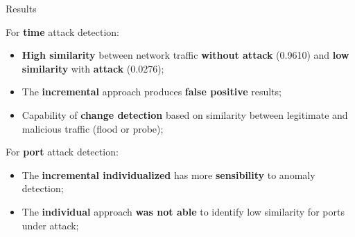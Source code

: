 \documentclass[newPxFont, numfooter, sectionpages]{beamer}
\begin{document}
\begin{frame}{Results}
	
	For \textbf{time} attack detection:
	\begin{itemize}
		\item \textbf{High similarity} between network traffic \textbf{without attack} (0.9610) and \textbf{low similarity} with \textbf{attack} (0.0276);
		\item The \textbf{incremental} approach produces \textbf{false positive} results;
		\item Capability of \textbf{change detection} based on similarity between legitimate and malicious traffic (flood or probe);
	\end{itemize}
	
	For \textbf{port} attack detection:
	\begin{itemize}
		\item The \textbf{incremental individualized} has more \textbf{sensibility} to anomaly detection;
		\item The \textbf{individual} approach \textbf{was not able} to identify low similarity for ports under attack;
	\end{itemize}
	
\end{frame}
	
\end{document}

